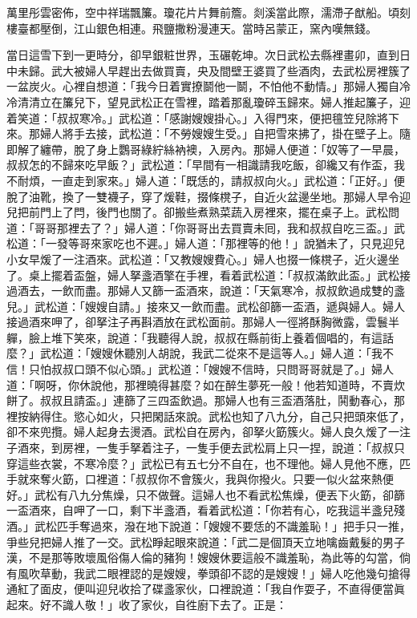 \begin{myquote}
萬里彤雲密佈，空中祥瑞飄簾。瓊花片片舞前簷。剡溪當此際，濡滯子猷船。頃刻樓臺都壓倒，江山銀色相連。飛鹽撒粉漫連天。當時呂蒙正，窯內嘆無錢。
\end{myquote}

當日這雪下到一更時分，卻早銀粧世界，玉碾乾坤。次日武松去縣裡畫卯，直到日中未歸。武大被婦人早趕出去做買賣，央及間壁王婆買了些酒肉，{}去武松房裡簇了一盆炭火。心裡自想道：「我今日着實撩鬬他一鬬，不怕他不動情。」那婦人獨自冷冷清清立在簾兒下，望見武松正在雪裡，踏着那亂瓊碎玉歸來。婦人推起簾子，迎着笑道：「叔叔寒冷。」武松道：「感謝嫂嫂掛心。」入得門來，便把氊笠兒除將下來。那婦人將手去接，武松道：「不勞嫂嫂生受。」自把雪來拂了，{}掛在壁子上。隨即解了纏帶，脫了身上鸚哥綠紵絲衲襖，入房內。那婦人便道：「奴等了一早晨，叔叔怎的不歸來吃早飯？」武松道：「早間有一相識請我吃飯，卻纔又有作盃，我不耐煩，一直走到家來。」婦人道：「既恁的，請叔叔向火。」武松道：「正好。」便脫了油靴，換了一雙襪子，穿了煖鞋，掇條櫈子，自近火盆邊坐地。{}那婦人早令迎兒把前門上了閂，後門也關了。卻搬些煮熟菜蔬入房裡來，擺在桌子上。武松問道：「哥哥那裡去了？」婦人道：「你哥哥出去買賣未囘，我和叔叔自吃三盃。」武松道：「一發等哥來家吃也不遲。」婦人道：「那裡等的他！」說猶未了，只見迎兒小女早煖了一注酒來。武松道：「又教嫂嫂費心。」婦人也掇一條櫈子，近火邊坐了。桌上擺着盃盤，婦人拏盞酒擎在手裡，看着武松道：「叔叔滿飲此盃。」武松接過酒去，一飲而盡。那婦人又篩一盃酒來，說道：「天氣寒冷，叔叔飲過成雙的盞兒。」{}武松道：「嫂嫂自請。」接來又一飲而盡。武松卻篩一盃酒，遞與婦人。婦人接過酒來呷了，卻拏注子再斟酒放在武松面前。那婦人一徑將酥胸微露，雲鬟半軃，{}臉上堆下笑來，說道：「我聽得人說，叔叔在縣前街上養着個唱的，有這話麼？」{}武松道：「嫂嫂休聽別人胡說，我武二從來不是這等人。」{}婦人道：「我不信！只怕叔叔口頭不似心頭。」武松道：「嫂嫂不信時，只問哥哥就是了。」婦人道：「啊呀，你休說他，那裡曉得甚麼？{}如在醉生夢死一般！{}他若知道時，不賣炊餅了。叔叔且請盃。」連篩了三四盃飲過。那婦人也有三盃酒落肚，鬨動春心，那裡按納得住。慾心如火，只把閑話來說。武松也知了八九分，自己只把頭來低了，卻不來兜攬。婦人起身去燙酒。武松自在房內，卻拏火筯簇火。{}婦人良久煖了一注子酒來，到房裡，一隻手拏着注子，一隻手便去武松肩上只一捏，說道：「叔叔只穿這些衣裳，不寒冷麼？」武松已有五七分不自在，也不理他。{}婦人見他不應，匹手就來奪火筯，口裡道：「叔叔你不會簇火，我與你撥火。只要一似火盆來熱便好。」武松有八九分焦燥，只不做聲。這婦人也不看武松焦燥，{}便丟下火筯，卻篩一盃酒來，自呷了一口，剩下半盞酒，看着武松道：「你若有心，吃我這半盞兒殘酒。」武松匹手奪過來，{}潑在地下說道：「嫂嫂不要恁的不識羞恥！」{}把手只一推，爭些兒把婦人推了一交。{}武松睜起眼來說道：「武二是個頂天立地噙齒戴髮的男子漢，不是那等敗壞風俗傷人倫的豬狗！{}嫂嫂休要這般不識羞恥，為此等的勾當，倘有風吹草動，我武二眼裡認的是嫂嫂，拳頭卻不認的是嫂嫂！」{}婦人吃他幾句搶得通紅了面皮，便叫迎兒收拾了碟盞家伙，{}口裡說道：「我自作耍子，不直得便當眞起來。好不識人敬！」{}收了家伙，自徃廚下去了。正是：


